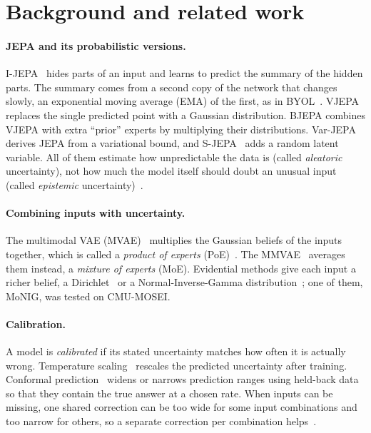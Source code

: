 \documentclass[10pt,twocolumn]{article}
\begin{document}
\section{Background and related work}
\paragraph{JEPA and its probabilistic versions.} I-JEPA~\cite{assran2023ijepa} hides parts of an input and learns to
predict the summary of the hidden parts. The summary comes from a second copy of the network that changes slowly, an
exponential moving average (EMA) of the first, as in BYOL~\cite{grill2020byol}. VJEPA~\cite{huang2026vjepa} replaces
the single predicted point with a Gaussian distribution. BJEPA combines VJEPA with extra ``prior'' experts by
multiplying their distributions. Var-JEPA~\cite{gogl2026varjepa} derives JEPA from a variational bound, and
S-JEPA~\cite{giakoumoglou2026sjepa} adds a random latent variable. All of them estimate how unpredictable the data is
(called \emph{aleatoric} uncertainty), not how much the model itself should doubt an unusual input (called
\emph{epistemic} uncertainty)~\cite{kendall2017uncertainties}.

\paragraph{Combining inputs with uncertainty.} The multimodal VAE (MVAE)~\cite{wu2018mvae} multiplies the Gaussian
beliefs of the inputs together, which is called a \emph{product of experts} (PoE)~\cite{hinton2002poe}. The MMVAE~\cite{shi2019mmvae}
averages them instead, a \emph{mixture of experts} (MoE). Evidential methods give each input a richer belief, a
Dirichlet~\cite{han2021tmc} or a Normal-Inverse-Gamma distribution~\cite{ma2021monig,amini2020evidential}; one of them,
MoNIG, was tested on CMU-MOSEI.

\paragraph{Calibration.} A model is \emph{calibrated} if its stated uncertainty matches how often it is actually wrong.
Temperature scaling~\cite{guo2017calibration} rescales the predicted uncertainty after training. Conformal
prediction~\cite{vovk2005algorithmic,angelopoulos2021gentle} widens or narrows prediction ranges using held-back data so
that they contain the true answer at a chosen rate. When inputs can be missing, one shared correction can be too wide for
some input combinations and too narrow for others, so a separate correction per combination helps~\cite{mccf2026}.
\end{document}

